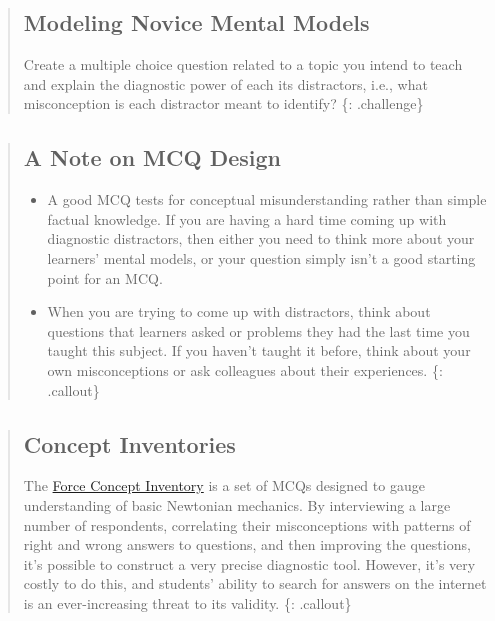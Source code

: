 \begin{quote}
\subsection{Modeling Novice Mental
Models}\label{modeling-novice-mental-models}

Create a multiple choice question related to a topic you intend to teach
and explain the diagnostic power of each its distractors, i.e., what
misconception is each distractor meant to identify? \{: .challenge\}
\end{quote}

\begin{quote}
\subsection{A Note on MCQ Design}\label{a-note-on-mcq-design}

\begin{itemize}
\itemsep1pt\parskip0pt
\item
  A good MCQ tests for conceptual misunderstanding rather than simple
  factual knowledge. If you are having a hard time coming up with
  diagnostic distractors, then either you need to think more about your
  learners' mental models, or your question simply isn't a good starting
  point for an MCQ.
\item
  When you are trying to come up with distractors, think about questions
  that learners asked or problems they had the last time you taught this
  subject. If you haven't taught it before, think about your own
  misconceptions or ask colleagues about their experiences. \{:
  .callout\}
\end{itemize}
\end{quote}

\begin{quote}
\subsection{Concept Inventories}\label{concept-inventories}

The \href{https://en.wikipedia.org/wiki/Force_Concept_Inventory}{Force
Concept Inventory} is a set of MCQs designed to gauge understanding of
basic Newtonian mechanics. By interviewing a large number of
respondents, correlating their misconceptions with patterns of right and
wrong answers to questions, and then improving the questions, it's
possible to construct a very precise diagnostic tool. However, it's very
costly to do this, and students' ability to search for answers on the
internet is an ever-increasing threat to its validity. \{: .callout\}
\end{quote}

